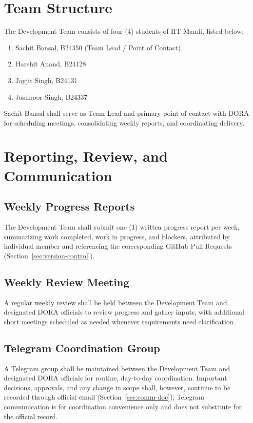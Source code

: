 \documentclass[11pt]{article}
\begin{document}
\section{Team Structure}
The Development Team consists of four (4) students of IIT Mandi, listed below:

\begin{enumerate}[leftmargin=1.8em, itemsep=4pt]
\item Sachit Bansal, B24350 (Team Lead / Point of Contact)
\item Harshit Anand, B24128
\item Jayjit Singh, B24131
\item Jashnoor Singh, B24337
\end{enumerate}

Sachit Bansal shall serve as Team Lead and primary point of contact with DORA for scheduling meetings, consolidating weekly reports, and coordinating delivery.

\section{Reporting, Review, and Communication}

\subsection{Weekly Progress Reports}
The Development Team shall submit one (1) written progress report per week, summarizing work completed, work in progress, and blockers, attributed by individual member and referencing the corresponding GitHub Pull Requests (Section~\ref{sec:version-control}).

\subsection{Weekly Review Meeting}
A regular weekly review shall be held between the Development Team and designated DORA officials to review progress and gather inputs, with additional short meetings scheduled as needed whenever requirements need clarification.

\subsection{Telegram Coordination Group}
A Telegram group shall be maintained between the Development Team and designated DORA officials for routine, day-to-day coordination. Important decisions, approvals, and any change in scope shall, however, continue to be recorded through official email (Section~\ref{sec:comm-doc}); Telegram communication is for coordination convenience only and does not substitute for the official record.
\end{document}
